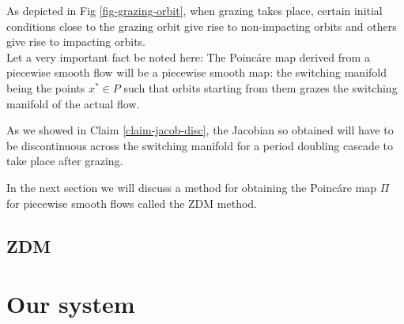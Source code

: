 \documentclass{book}
\renewcommand{\(}{\begin{columns}}
\renewcommand{\)}{\end{columns}}
\newcommand{\<}[1]{\begin{column}{#1}}
\renewcommand{\>}{\end{column}}
\begin{document}
As depicted in Fig \ref{fig-grazing-orbit}, when grazing takes place, certain 
initial conditions close to the grazing orbit give rise to non-impacting 
orbits and others give rise to impacting orbits.  \\


Let a very important fact be noted here: The Poincáre map derived from a 
piecewise smooth flow  
will be a piecewise smooth map: the switching manifold being the points 
$x^*\in P$ such that orbits starting from them grazes the switching manifold 
of the actual flow.  

As we showed in Claim \ref{claim-jacob-disc}, the Jacobian so obtained will 
have to be discontinuous across the switching manifold for a period doubling 
cascade to take place after grazing.  


In the next section we will discuss a method for obtaining the Poincáre map 
$\Pi$ for piecewise smooth flows called the ZDM method.  

\section{ZDM}


\chapter{Our system}












{}

\end{document}
